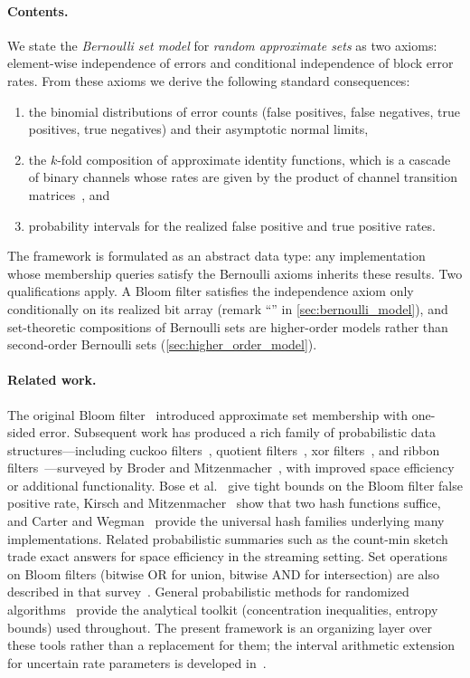 \paragraph{Contents.}
We state the \emph{Bernoulli set model} for \emph{random approximate sets} as two axioms: element-wise independence of errors and conditional independence of block error rates.
From these axioms we derive the following standard consequences:
\begin{enumerate}[nosep]
    \item the binomial distributions of error counts (false positives, false negatives, true positives, true negatives) and their asymptotic normal limits,
    \item the $k$-fold composition of approximate identity functions, which is a cascade of binary channels whose rates are given by the product of channel transition matrices~\cite{coverThomas}, and
    \item probability intervals for the realized false positive and true positive rates.
\end{enumerate}
The framework is formulated as an abstract data type: any implementation whose membership queries satisfy the Bernoulli axioms inherits these results.
Two qualifications apply.
A Bloom filter satisfies the independence axiom only conditionally on its realized bit array (remark ``'' in \cref{sec:bernoulli_model}), and set-theoretic compositions of Bernoulli sets are higher-order models rather than second-order Bernoulli sets (\cref{sec:higher_order_model}).

\paragraph{Related work.}
The original Bloom filter~\cite{bf} introduced approximate set membership with one-sided error.
Subsequent work has produced a rich family of probabilistic data structures---including cuckoo filters~\cite{cuckooFilter}, quotient filters~\cite{quotientFilter}, xor filters~\cite{xorFilter}, and ribbon filters~\cite{ribbonFilter}---surveyed by Broder and Mitzenmacher~\cite{broderMitzenmacher}, with improved space efficiency or additional functionality.
Bose et al.~\cite{boseBloom} give tight bounds on the Bloom filter false positive rate, Kirsch and Mitzenmacher~\cite{kirschMitzenmacher} show that two hash functions suffice, and Carter and Wegman~\cite{carterWegman} provide the universal hash families underlying many implementations.
Related probabilistic summaries such as the count-min sketch~\cite{countMinSketch} trade exact answers for space efficiency in the streaming setting.
Set operations on Bloom filters (bitwise OR for union, bitwise AND for intersection) are also described in that survey~\cite{broderMitzenmacher}.
General probabilistic methods for randomized algorithms~\cite{mitzenmacherUpfal} provide the analytical toolkit (concentration inequalities, entropy bounds) used throughout.
The present framework is an organizing layer over these tools rather than a replacement for them; the interval arithmetic extension for uncertain rate parameters is developed in~\cite{bernoulliComposition}.

